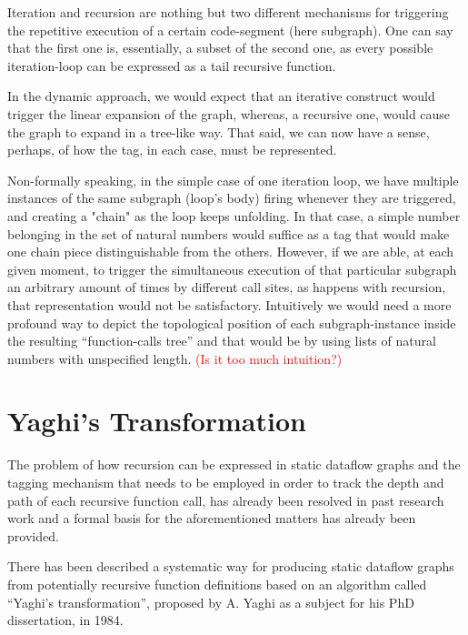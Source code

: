 \documentclass[ack,preface]{dithesis}
\begin{document}
Iteration and recursion are nothing but two different mechanisms for triggering the repetitive execution of a certain code-segment (here subgraph). One can say that the first one is, essentially, a subset of the second one, as every possible iteration-loop can be expressed as a tail recursive function. 

In the dynamic approach, we would expect that an iterative construct would trigger the linear expansion of the graph, whereas, a recursive one, would cause the graph to expand in a tree-like way. That said, we can now have a sense, perhaps, of how the tag, in each case, must be represented. 

Non-formally speaking, in the simple case of one iteration loop, we have multiple instances of the same subgraph (loop’s body) firing whenever they are triggered, and creating a "chain" as the loop keeps unfolding. In that case, a simple number belonging in the set of natural numbers would suffice as a tag that would make one chain piece distinguishable from the others. However, if we are able, at each given moment, to trigger the simultaneous execution of that particular subgraph an arbitrary amount of times by different call sites, as happens with recursion, that representation would not be satisfactory. Intuitively we would need a more profound way to depict the topological position of each subgraph-instance inside the resulting “function-calls tree” and that would be by using lists of natural numbers with unspecified length. \textcolor{red}{(Is it too much intuition?)}





    \section{Yaghi's Transformation}

The problem of how recursion can be expressed in static dataflow graphs and the tagging mechanism that needs to be employed in order to track the depth and path of each recursive function call, has already been resolved in past research work and a formal basis for the aforementioned matters has already been provided.  \cite{Rondogiannis:1997}

There has been described a systematic way for producing static dataflow graphs from potentially recursive function definitions based on an algorithm called “Yaghi’s transformation”, proposed by A. Yaghi as a subject for his PhD dissertation, in 1984.
\end{document}
